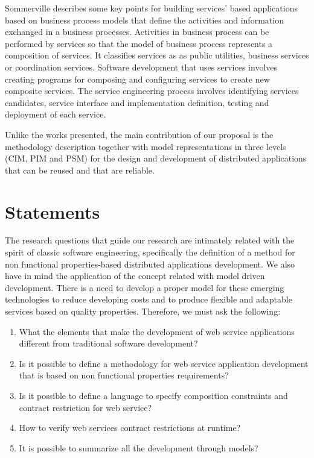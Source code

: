 \documentclass{article}
\begin{document}
Sommerville \cite{sommerville08} describes some key points for building services' based applications based on business process models that define the activities and information
exchanged in a business processes. Activities in business process
can be performed by services so that the model of business process
represents a composition of services. It classifies services as  as public utilities, business services or
coordination services. Software development that uses services involves creating
programs for composing and configuring services to create new
composite services. The service engineering process involves identifying services
candidates, service interface and
implementation definition, testing and deployment of each service.

Unlike the works presented, the main contribution of our proposal is the
methodology description together with model representations in three levels (CIM, PIM and PSM) 
 for the design and development of distributed applications that can be reused
 and that are reliable. 
 


\section{Statements}  
\label{sec:challenges}   

The research questions that guide our research are
intimately related with the spirit of classic software engineering, specifically
the definition of a method for non functional properties-based distributed
applications development. We also have in mind the application of the concept related with
model driven development. There is a need to develop a proper model for these
emerging technologies to reduce developing costs and to produce flexible and adaptable
services based on quality properties. Therefore, we must ask the following:

\begin{enumerate}
  \item What the elements that make the development of web
  service applications different from traditional software development?
  \item Is it possible to define a methodology for web service application
  development that is based on non functional properties requirements?
  \item Is it possible to define a language to specify composition constraints
  and contract restriction for web service?
  \item How to verify web services contract restrictions at runtime?
  \item It is possible to summarize all the development through models?
\end{enumerate}
 
\end{document}
